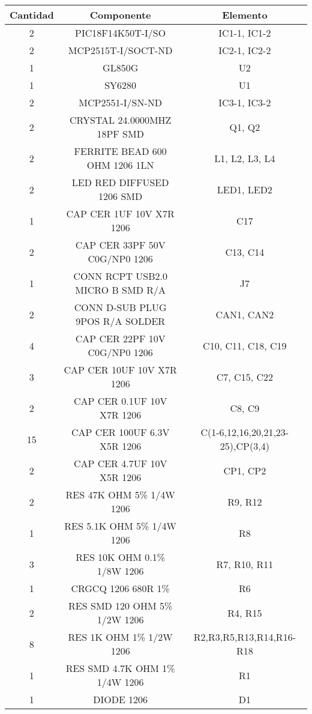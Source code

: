 \begin{center}
 \begin{tabular}{||c c c||} 
 \hline
 Cantidad & Componente & Elemento \\ [0.8ex] 
 \hline\hline
 2 & PIC18F14K50T-I/SO & IC1-1, IC1-2 \\ 
 \hline
 2 & MCP2515T-I/SOCT-ND & IC2-1, IC2-2\\
  \hline
 1 & GL850G & U2\\
   \hline
 1 & SY6280 & U1\\
 \hline
 2 & MCP2551-I/SN-ND & IC3-1, IC3-2\\
 \hline
 2 & CRYSTAL 24.0000MHZ 18PF SMD & Q1, Q2\\
 \hline
 2 & FERRITE BEAD 600 OHM 1206 1LN & L1, L2, L3, L4\\
  \hline
 2 & LED RED DIFFUSED 1206 SMD & LED1, LED2\\
  \hline
 1 & CAP CER 1UF 10V X7R 1206 & C17\\
   \hline
 2 & CAP CER 33PF 50V C0G/NP0 1206 & C13, C14\\
  \hline
 1 & CONN RCPT USB2.0 MICRO B SMD R/A & J7\\
  \hline
 2 & CONN D-SUB PLUG 9POS R/A SOLDER & CAN1, CAN2\\
  \hline
 4 & CAP CER 22PF 10V C0G/NP0 1206 & C10, C11, C18, C19\\
  \hline
 3 & CAP CER 10UF 10V X7R 1206 & C7, C15, C22\\
  \hline
 2 & CAP CER 0.1UF 10V X7R 1206 & C8, C9\\
  \hline
 15 & CAP CER 100UF 6.3V X5R 1206 & C(1-6,12,16,20,21,23-25),CP(3,4)\\
  \hline
 2 & CAP CER 4.7UF 10V X5R 1206 & CP1, CP2\\
   \hline
 2 & RES 47K OHM 5\% 1/4W 1206  & R9, R12\\
   \hline
 1 & RES 5.1K OHM 5\% 1/4W 1206  & R8\\
   \hline
 3 & RES 10K OHM 0.1\% 1/8W 1206  & R7, R10, R11\\
   \hline
 1 &  CRGCQ 1206 680R 1\% & R6\\
   \hline
 2 &  RES SMD 120 OHM 5\% 1/2W 1206  & R4, R15\\
    \hline
 8 &  RES 1K OHM 1\% 1/2W 1206  & R2,R3,R5,R13,R14,R16-R18\\
 \hline
 1 &  RES SMD 4.7K OHM 1\% 1/4W 1206 & R1 \\ 
  \hline
 1 &  DIODE 1206 & D1 \\[1ex] 
 \hline
\end{tabular}
\end{center}


